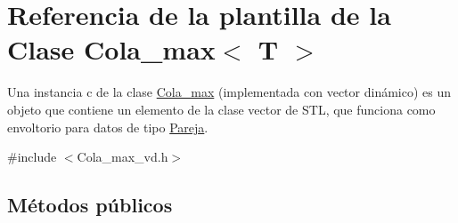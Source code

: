\hypertarget{classCola__max}{}\section{Referencia de la plantilla de la Clase Cola\+\_\+max$<$ T $>$}
\label{classCola__max}


Una instancia c de la clase \hyperlink{classCola__max}{Cola\+\_\+max} (implementada con vector dinámico) es un objeto que contiene un elemento de la clase vector de S\+TL, que funciona como envoltorio para datos de tipo \hyperlink{structPareja}{Pareja}.  




{\ttfamily \#include $<$Cola\+\_\+max\+\_\+vd.\+h$>$}

\subsection*{Métodos públicos}
